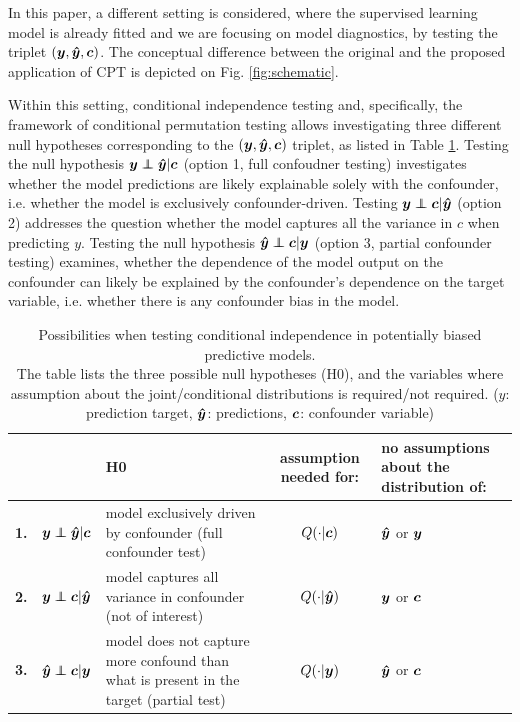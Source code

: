\documentclass{article}
\begin{document}
In this paper, a different setting is considered, where the supervised learning model is already fitted and we are focusing on model diagnostics, by testing the triplet $(\boldsymbol{y},\boldsymbol{\hat{y}}, \boldsymbol{c})$. The conceptual difference between the original and the proposed application of CPT is depicted on Fig. \ref{fig:schematic}.

Within this setting, conditional independence testing and, specifically, the framework of conditional permutation testing allows investigating three different null hypotheses corresponding to the $(\boldsymbol{y}, \boldsymbol{\hat{y}}, \boldsymbol{c})$ triplet, as listed in Table \ref{tab:conditional-independence-cases}. Testing the null hypothesis $\y \independent \yhat | \c$ (option 1, full confoudner testing) investigates whether the model predictions are likely explainable solely with the confounder, i.e. whether the model is exclusively confounder-driven. Testing $\y \independent \c | \yhat$ (option 2) addresses the question whether the model captures all the variance in $c$ when predicting $y$. Testing the null hypothesis $\yhat \independent \c | \y$ (option 3, partial confounder testing) examines, whether the dependence of the model output on the confounder can likely be explained by the confounder's dependence on the target variable, i.e. whether there is any confounder bias in the model.

\renewcommand{\arraystretch}{1.2}
\begin{table}[]
\centering
\begin{tabular}{l|rp{60mm}|c|>{\centering\arraybackslash}m{30mm}}
 &  & H0  & assumption needed for: & no assumptions about the distribution of: \\
\hline
\textbf{1.} & $\y \independent \yhat | \c$ \quad  & model exclusively driven by confounder (full confounder test) & $Q(\cdot|\boldsymbol{c})$ & $\boldsymbol{\hat{y}}$ or $\boldsymbol{y}$ \\
\textbf{2.} & $\y \independent \c | \yhat$ \quad & model captures all variance in confounder (not of interest) & $Q(\cdot|\boldsymbol{\hat{y}})$ & $\boldsymbol{y}$ or $\boldsymbol{c}$ \\
\textbf{3.} & $\yhat \independent \c | \y$  \quad &  model does not capture more confound than what is present in the target (partial test) & $Q(\cdot|\boldsymbol{y})$ & $\boldsymbol{\hat{y}}$ or $\boldsymbol{c}$ \\
\end{tabular}
\caption{\label{tab:conditional-independence-cases} Possibilities when testing conditional independence in potentially biased predictive models. \\The table lists the three possible null hypotheses (H0), and the variables where assumption about the joint/conditional distributions is required/not required.   ($y$: prediction target, $\boldsymbol{\hat{y}}$: predictions, $\boldsymbol{c}$: confounder variable) }
\end{table}
\end{document}
